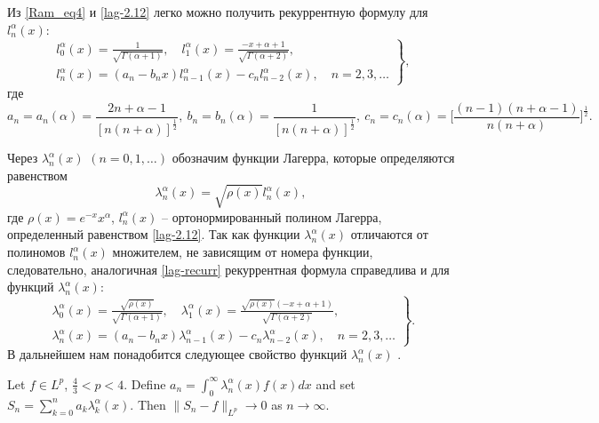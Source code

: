 Из \eqref{Ram_eq4} и \eqref{lag-2.12} легко можно получить рекуррентную формулу для $l_n^\alpha(x)$:
\begin{equation}\label{lag-recurr}
\left.\begin{gathered}
l_{0}^{\alpha}(x)=\frac{1}{\sqrt{\Gamma(\alpha+1)}}, \quad l_1^{\alpha}(x)=\frac{-x+\alpha+1}{\sqrt{\Gamma(\alpha+2)}},\\
l_n^{\alpha}(x)=(a_n-b_n x)l_{n-1}^{\alpha}(x)-c_n l_{n-2}^{\alpha}(x), \quad n=2, 3, \ldots
\end{gathered}\right\},
\end{equation}
где
\begin{equation*}
a_n=a_n(\alpha)=\frac{2n+\alpha-1}{[n(n+\alpha)]^\frac{1}{2}},\
b_n=b_n(\alpha)=\frac{1}{[n(n+\alpha)]^\frac{1}{2}},\
c_n=c_n(\alpha)=\Big[\frac{(n-1)(n+\alpha-1)}{n(n+\alpha)}\Big]^\frac{1}{2}.
\end{equation*}

Через $\lambda_n^\alpha(x)$ $(n=0, 1, \ldots)$ обозначим функции Лагерра, которые определяются равенством
\begin{equation}\label{funcLag}
\lambda_n^\alpha(x)=\sqrt{\rho(x)}l_n^\alpha(x),
\end{equation}
где $\rho(x)=e^{-x}x^\alpha$, $l_n^\alpha(x)$ -- ортонормированный полином Лагерра, определенный равенством \eqref{lag-2.12}.
Так как функции $\lambda_n^\alpha(x)$ отличаются от полиномов $l_n^\alpha(x)$ множителем, не зависящим от номера функции, следовательно, аналогичная \eqref{lag-recurr} рекуррентная формула справедлива и для функций $\lambda_n^\alpha(x)$:
\begin{equation*}
\left.\begin{gathered}
\lambda_{0}^{\alpha}(x)=\frac{\sqrt{\rho(x)}}{\sqrt{\Gamma(\alpha+1)}}, \quad \lambda_1^{\alpha}(x)=\frac{\sqrt{\rho(x)}(-x+\alpha+1)}{\sqrt{\Gamma(\alpha+2)}},\\
\lambda_n^{\alpha}(x)=(a_n-b_n x)\lambda_{n-1}^{\alpha}(x)-c_n \lambda_{n-2}^{\alpha}(x), \quad n=2, 3, \ldots
\end{gathered}\right\}.
\end{equation*}
В дальнейшем нам понадобится следующее свойство функций $\lambda_{n}^{\alpha}(x)$ \cite[Theorem 1]{AskeyWaiger}.

\begin{theoremA}\label{Ram_thA}
	Let $f\in L^p$, $\frac{4}{3}<p<4$. Define $a_n=\int_{0}^{\infty}\lambda^\alpha_n(x)f(x)dx$ and set $S_n=\sum_{k=0}^{n}a_k\lambda^\alpha_k(x)$. Then $\|S_n-f\|_{L^p}\rightarrow0$ as $n\rightarrow\infty$.
\end{theoremA}


